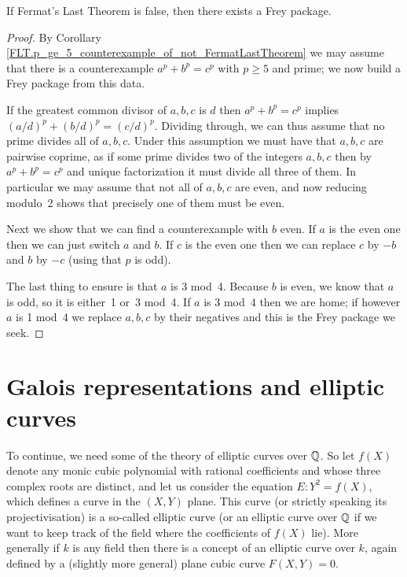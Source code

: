 \begin{lemma}\label{FLT.FreyPackage.of_not_FermatLastTheorem}\leanok{}
  If Fermat's Last Theorem is false, then there exists a Frey package.
\end{lemma}
\begin{proof} By Corollary \ref{FLT.p_ge_5_counterexample_of_not_FermatLastTheorem} we may assume that there is a counterexample $a^p+b^p=c^p$ with $p\geq 5$ and prime; we now build a Frey package from this data.
  
  If the greatest common divisor of $a,b,c$ is $d$ then $a^p+b^p=c^p$ implies $(a/d)^p+(b/d)^p=(c/d)^p$. Dividing through, we can thus assume that no prime divides all of $a,b,c$. Under this assumption we must have that $a,b,c$ are pairwise coprime, as if some prime divides two of the integers $a,b,c$ then by $a^p+b^p=c^p$ and unique factorization it must divide all three of them. In particular we may assume that not all of $a,b,c$ are even, and now reducing modulo~2 shows that precisely one of them must be even. 
  
  Next we show that we can find a counterexample with $b$ even. If $a$ is the even one then we can just switch $a$ and $b$. If $c$ is the even one then we can replace $c$ by $-b$ and $b$ by $-c$ (using that $p$ is odd).

  The last thing to ensure is that $a$ is 3 mod~4. Because $b$ is even, we know that $a$ is odd, so it is either~1 or~3 mod~4. If $a$ is 3 mod~4 then we are home; if however $a$ is 1 mod~4 we replace $a,b,c$ by their negatives and this is the Frey package we seek.
\end{proof}

\section{Galois representations and elliptic curves}\label{twopointfour}

To continue, we need some of the theory of elliptic curves over $\mathbb{Q}$. So let $f(X)$ denote any monic cubic polynomial with rational coefficients and whose three complex roots are distinct, and let us consider the equation $E:Y^2=f(X)$, which defines a curve in the $(X,Y)$ plane. This curve (or strictly speaking its projectivisation) is a so-called elliptic curve (or an elliptic curve over $\mathbb{Q}$ if we want to keep track of the field where the coefficients of $f(X)$ lie). More generally if $k$ is any field then there is a concept of an elliptic curve over $k$, again defined by a (slightly more general) plane cubic curve $F(X,Y)=0$.

